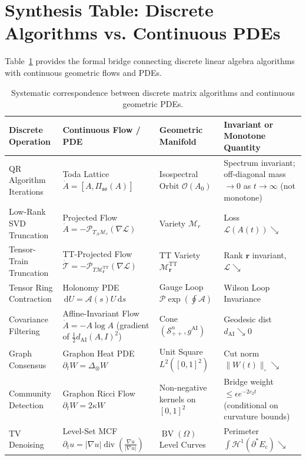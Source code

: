 \documentclass[11pt,a4paper,reqno]{amsart}
\theoremstyle{definition}
\numberwithin{equation}{section}
\providecommand{\BV}{\operatorname{BV}}
\providecommand{\cutnorm}[1]{\|#1\|_{\square}}
\newcommand{\dif}{\,\mathrm{d}}
\providecommand{\BV}{\mathrm{BV}}
\providecommand{\cutnorm}[1]{\|#1\|_{\square}}
\begin{document}
\section{Synthesis Table: Discrete Algorithms vs. Continuous PDEs}
\label{sec:synthesis}

Table~\ref{tab:flows_comparison} provides the formal bridge connecting discrete linear algebra algorithms with continuous geometric flows and PDEs.

\begin{table}[htbp]
\centering
\scriptsize
\renewcommand{\arraystretch}{1.3}
\begin{tabularx}{\textwidth}{@{}lXlX@{}}
\toprule
\textbf{Discrete Operation} & \textbf{Continuous Flow / PDE} & \textbf{Geometric Manifold} & \textbf{Invariant or Monotone Quantity} \\
\midrule
QR Algorithm Iterations & Toda Lattice $\dot{A} = [A, \Pi_{\mathfrak{so}}(A)]$ & Isospectral Orbit $\mathcal{O}(A_0)$ & Spectrum invariant; off-diagonal mass $\to 0$ as $t \to \infty$ (not monotone) \\
Low-Rank SVD Truncation & Projected Flow $\dot{A} = -\mathcal{P}_{T_A \mathcal{M}_r}(\nabla \mathcal{L})$ & Variety $\mathcal{M}_r$ & Loss $\mathcal{L}(A(t)) \searrow$ \\
Tensor-Train Truncation & TT-Projected Flow $\dot{\mathcal{T}} = -\mathcal{P}_{T \mathcal{M}_{\mathbf{r}}^{\mathrm{TT}}}(\nabla \mathcal{L})$ & TT Variety $\mathcal{M}_{\mathbf{r}}^{\mathrm{TT}}$ & Rank $\mathbf{r}$ invariant, $\mathcal{L} \searrow$ \\
Tensor Ring Contraction & Holonomy PDE $\dif U = \mathcal{A}(s) U \dif s$ & Gauge Loop $\mathcal{P} \exp(\oint \mathcal{A})$ & Wilson Loop Invariance \\
Covariance Filtering & Affine-Invariant Flow $\dot{A} = -A \log A$ (gradient of $\tfrac12 d_{\mathrm{AI}}(A,I)^2$) & Cone $(\mathcal{S}_{++}^n, g^{\mathrm{AI}})$ & Geodesic dist $d_{\mathrm{AI}} \searrow 0$ \\
Graph Consensus & Graphon Heat PDE $\partial_t W = \Delta_\otimes W$ & Unit Square $L^2([0,1]^2)$ & Cut norm $\cutnorm{W(t)} \searrow$ \\
Community Detection & Graphon Ricci Flow $\partial_t W = 2\kappa W$ & Non-negative kernels on $[0,1]^2$ & Bridge weight $\le \epsilon e^{-2c_2 t}$ (conditional on curvature bounds) \\
TV Denoising & Level-Set MCF $\partial_t u = |\nabla u| \operatorname{div}(\frac{\nabla u}{|\nabla u|})$ & $\BV(\Omega)$ Level Curves & Perimeter $\int \mathcal{H}^1(\partial^* E_c) \searrow$ \\
\bottomrule
\end{tabularx}
\caption{Systematic correspondence between discrete matrix algorithms and continuous geometric PDEs.}
\label{tab:flows_comparison}
\end{table}
\end{document}
